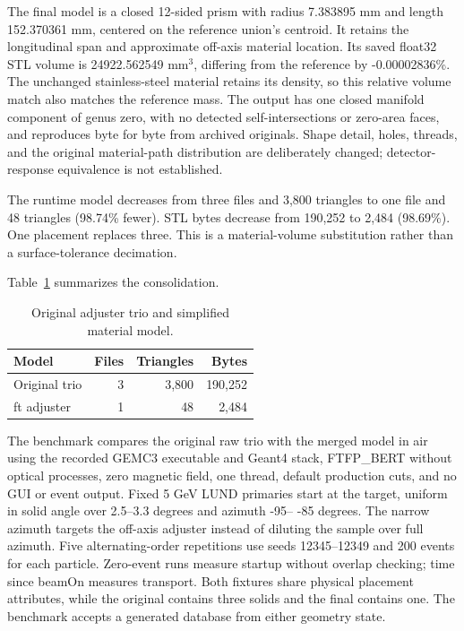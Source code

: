 The final model is a closed 12-sided prism with radius 7.383895 mm and length 152.370361 mm, centered on the
reference union's centroid. It retains the longitudinal span and approximate off-axis material location. Its
saved float32 STL volume is 24922.562549 mm$^3$, differing from the reference by -0.00002836\%. The
unchanged stainless-steel material retains its density, so this relative volume match also matches the
reference mass. The output has one closed manifold component of genus zero, with no detected
self-intersections or zero-area faces, and reproduces byte for byte from archived originals. Shape detail,
holes, threads, and the original material-path distribution are deliberately changed; detector-response
equivalence is not established.

The runtime model decreases from three files and 3,800 triangles to one file and 48 triangles (98.74\%
fewer). STL bytes decrease from 190,252 to 2,484 (98.69\%). One placement replaces three. This is a
material-volume substitution rather than a surface-tolerance decimation.

Table~\ref{tab:adjuster-meshes} summarizes the consolidation.

\begin{table}[htbp]
\centering
\caption{Original adjuster trio and simplified material model.}
\label{tab:adjuster-meshes}
\begin{tabular}{lrrr}
\toprule
Model & Files & Triangles & Bytes \\
\midrule
Original trio & 3 & 3,800 & 190,252 \\
ft adjuster & 1 & 48 & 2,484 \\
\bottomrule
\end{tabular}
\end{table}

The benchmark compares the original raw trio with the merged model in air using the recorded GEMC3
executable and Geant4 stack, FTFP\_BERT without optical processes, zero magnetic field, one thread, default
production cuts, and no GUI or event output. Fixed 5 GeV LUND primaries start at the target, uniform in
solid angle over 2.5--3.3 degrees and azimuth -95-- -85 degrees. The narrow azimuth targets the off-axis
adjuster instead of diluting the sample over full azimuth. Five alternating-order repetitions use seeds
12345--12349 and 200 events for each particle. Zero-event runs measure startup without overlap checking;
time since beamOn measures transport. Both fixtures share physical placement attributes, while the original
contains three solids and the final contains one. The benchmark accepts a generated database from either
geometry state.

